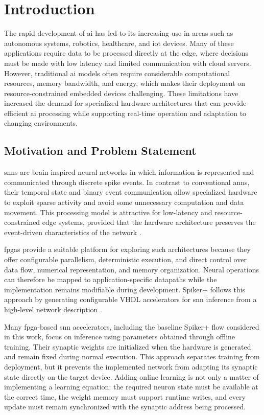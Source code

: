 \chapter{Introduction}
\label{sec:introduction}

The rapid development of \gls{ai} has led to its increasing use in areas such as autonomous systems, robotics, healthcare, and \gls{iot} devices. Many of these applications require data to be processed directly at the edge, where decisions must be made with low latency and limited communication with cloud servers. However, traditional \gls{ai} models often require considerable computational resources, memory bandwidth, and energy, which makes their deployment on resource-constrained embedded devices challenging. These limitations have increased the demand for specialized hardware architectures that can provide efficient \gls{ai} processing while supporting real-time operation and adaptation to changing environments.

\section{Motivation and Problem Statement}
\label{subsec:motivation-and-problem-statement}

\Glspl{snn} are brain-inspired neural networks in which information is represented and communicated through discrete spike events. In contrast to conventional \glspl{ann}, their temporal state and binary event communication allow specialized hardware to exploit sparse activity and avoid some unnecessary computation and data movement. This processing model is attractive for low-latency and resource-constrained edge systems, provided that the hardware architecture preserves the event-driven characteristics of the network \cite{Carpegna2025}.

\Glspl{fpga} provide a suitable platform for exploring such architectures because they offer configurable parallelism, deterministic execution, and direct control over data flow, numerical representation, and memory organization. Neural operations can therefore be mapped to application-specific datapaths while the implementation remains modifiable during development. Spiker+ follows this approach by generating configurable VHDL accelerators for \gls{snn} inference from a high-level network description \cite{Carpegna2025}.

Many \gls{fpga}-based \gls{snn} accelerators, including the baseline Spiker+ flow considered in this work, focus on inference using parameters obtained through offline training. Their synaptic weights are initialized when the hardware is generated and remain fixed during normal execution. This approach separates training from deployment, but it prevents the implemented network from adapting its synaptic state directly on the target device. Adding online learning is not only a matter of implementing a learning equation: the required neuron state must be available at the correct time, the weight memory must support runtime writes, and every update must remain synchronized with the synaptic address being processed.

